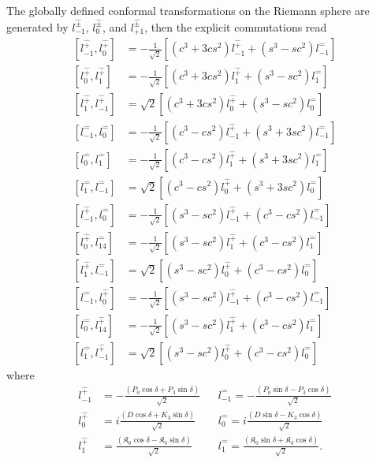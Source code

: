 \documentclass[%
 reprint,
superscriptaddress,
 amsmath,amssymb,
 aps,
]{revtex4-2}
\begin{document}
The globally defined conformal transformations on the Riemann sphere are generated by $l^{\hat{\pm}}_{-1}$, $l^{\hat{\pm}}_{0}$, and $l^{\hat{\pm}}_{+1}$, then the explicit commutations read
\begin{subequations}
\begin{align}
    [l^{\hat{+}}_{-1},l^{\hat{+}}_{0}]&=-\frac{1}{\sqrt{2}}[(c^{3}+3cs^{2})l^{\hat{+}}_{-1}+(s^{3}-sc^{2})l^{\hat{-}}_{-1}]\\
    [l^{\hat{+}}_{0},l^{\hat{+}}_{1}]&=-\frac{1}{\sqrt{2}}[(c^{3}+3cs^{2})l^{\hat{+}}_{1}+(s^{3}-sc^{2})l^{\hat{-}}_{1}]\\
    [l^{\hat{+}}_{1},l^{\hat{+}}_{-1}]&=\sqrt{2}[(c^{3}+3cs^{2})l^{\hat{+}}_{0}+(s^{3}-sc^{2})l^{\hat{-}}_{0}]\\
    [l^{\hat{-}}_{-1},l^{\hat{-}}_{0}]&=-\frac{1}{\sqrt{2}}[(c^{3}-cs^{2})l^{\hat{+}}_{-1}+(s^{3}+3sc^{2})l^{\hat{-}}_{-1}]\\
    [l^{\hat{-}}_{0},l^{\hat{-}}_{1}]&=-\frac{1}{\sqrt{2}}[(c^{3}-cs^{2})l^{\hat{+}}_{1}+(s^{3}+3sc^{2})l^{\hat{-}}_{1}]\\
    [l^{\hat{-}}_{1},l^{\hat{-}}_{-1}]&=\sqrt{2}[(c^{3}-cs^{2})l^{\hat{+}}_{0}+(s^{3}+3sc^{2})l^{\hat{-}}_{0}]\\
    [l^{\hat{+}}_{-1},l^{\hat{-}}_{0}]&=-\frac{1}{\sqrt{2}}[(s^{3}-sc^{2})l^{\hat{+}}_{-1}+(c^{3}-cs^{2})l^{\hat{-}}_{-1}]\\
    [l^{\hat{+}}_{0},l^{\hat{-}}_{14}]&=-\frac{1}{\sqrt{2}}[(s^{3}-sc^{2})l^{\hat{+}}_{1}+(c^{3}-cs^{2})l^{\hat{-}}_{1}]\\
    [l^{\hat{+}}_{1},l^{\hat{-}}_{-1}]&=\sqrt{2}[(s^{3}-sc^{2})l^{\hat{+}}_{0}+(c^{3}-cs^{2})l^{\hat{-}}_{0}]\\
    [l^{\hat{-}}_{-1},l^{\hat{+}}_{0}]&=-\frac{1}{\sqrt{2}}[(s^{3}-sc^{2})l^{\hat{+}}_{-1}+(c^{3}-cs^{2})l^{\hat{-}}_{-1}]\\
    [l^{\hat{-}}_{0},l^{\hat{+}}_{14}]&=-\frac{1}{\sqrt{2}}[(s^{3}-sc^{2})l^{\hat{+}}_{1}+(c^{3}-cs^{2})l^{\hat{-}}_{1}]\\
    [l^{\hat{-}}_{1},l^{\hat{+}}_{-1}]&=\sqrt{2}[(s^{3}-sc^{2})l^{\hat{+}}_{0}+(c^{3}-cs^{2})l^{\hat{-}}_{0}]
\end{align}
\label{interpolating-Witt}
\end{subequations}
where
\begin{align}
    l^{\hat{+}}_{-1}&=-\frac{(P_{0}\cos{\delta}+P_{3}\sin{\delta})}{\sqrt{2}} &&l^{\hat{-}}_{-1}=-\frac{(P_{0}\sin{\delta}-P_{3}\cos{\delta})}{\sqrt{2}}\\
    l^{\hat{+}}_{0}&=i\frac{(D\cos{\delta}+K_{3}\sin{\delta})}{\sqrt{2}} &&l^{\hat{-}}_{0}=i\frac{(D\sin{\delta}-K_{3}\cos{\delta})}{\sqrt{2}}\\
    l^{\hat{+}}_{1}&=\frac{(\mathfrak{K}_{0}\cos{\delta}-\mathfrak{K}_{3}\sin{\delta})}{\sqrt{2}} &&l^{\hat{-}}_{1}=\frac{(\mathfrak{K}_{0}\sin{\delta}+\mathfrak{K}_{3}\cos{\delta})}{\sqrt{2}}.
\end{align}
\end{document}
